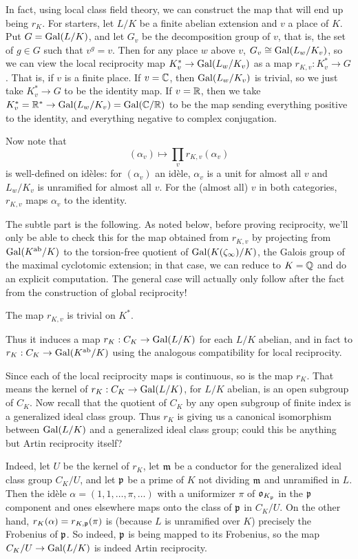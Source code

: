 In fact, using local class field theory, we can construct the map that
will end up being $r_K$. For starters, let $L/K$ be a finite abelian
extension and $v$ a place of $K$. Put $G = \operatorname{Gal}(L/K)$, and let $G_v$ be
the decomposition group of $v$, that is, the set of $g \in G$
such that $v^g = v$. Then for any place $w$ above $v$,
$G_v \cong \operatorname{Gal}(L_w/K_v)$, so we can view the local reciprocity map
$K_v^* \to \operatorname{Gal}(L_w/K_v)$ as a map $r_{K,v}: K_v^* \to G$. That is, if $v$
is a finite place. If $v = \mathbb{C}$, then $\operatorname{Gal}(L_w/K_v)$ is trivial, so
we just take $K_v^* \to G$ to be the identity map. If $v = \mathbb{R}$, then we
take $K_v^* = \mathbb{R}^* \to \operatorname{Gal}(L_w/K_v) = \operatorname{Gal}(\mathbb{C}/\mathbb{R})$ to be the map
sending everything positive to the identity, and everything negative
to complex conjugation.

Now note that
\[
(\alpha_v) \mapsto \prod_v r_{K,v}(\alpha_v) 
\]
is well-defined on id\`eles: for $(\alpha_v)$ an id\`ele, $\alpha_v$ is
a unit for almost all $v$ and $L_w/K_v$ is unramified for almost all
$v$. For the (almost all) $v$ in both categories, $r_{K,v}$ maps
$\alpha_v$ to the identity.

The subtle part is the following. As noted below, before proving reciprocity,
we'll only be able to check this for the map obtained from $r_{K,v}$ by
projecting from $\operatorname{Gal}(K^{\operatorname{ab}}/K)$ to the torsion-free quotient of $\operatorname{Gal}(K(\zeta_\infty)/K)$, the Galois
group of the maximal cyclotomic extension; in that case, we can reduce to
$K=\mathbb{Q}$ and do an explicit computation. The general case will actually only
follow after the fact from the construction of global reciprocity!
\begin{prop}
The map $r_{K,v}$ is trivial on $K^*$.    
\end{prop}
Thus it induces a map $r_K: C_K \to \operatorname{Gal}(L/K)$ for each $L/K$ abelian,
and in fact to $r_K: C_K \to \operatorname{Gal}(K^{\operatorname{ab}}/K)$ using the analogous
compatibility for local reciprocity.

Since each of the local reciprocity maps is continuous, so is the map $r_K$.
That means the kernel of $r_K: C_K \to \operatorname{Gal}(L/K)$, for $L/K$ abelian,
is an open subgroup of $C_K$. Now recall that the
quotient of $C_K$ by any open subgroup of finite index is a generalized
ideal class group. Thus $r_K$ is giving us a canonical isomorphism between
$\operatorname{Gal}(L/K)$ and a generalized ideal class group; could this be anything
but Artin reciprocity itself? 

Indeed, let $U$ be the kernel of $r_K$,  let $\mathfrak{m}$ be a conductor
for the generalized ideal class group $C_K/U$, and let $\mathfrak{p}$ be a
prime of $K$ not dividing $\mathfrak{m}$ and unramified in $L$. Then
the id\`ele $\alpha = (1,1, \dots, \pi, \dots)$ with a uniformizer $\pi$
of $\mathfrak{o}_{K_{\mathfrak{p}}}$ in the $\mathfrak{p}$ component and ones elsewhere
maps onto the class of $\mathfrak{p}$ in $C_K/U$. On the other hand,
$r_K(\alpha) = r_{K, \mathfrak{p}}(\pi)$ is (because $L$ is unramified over $K$)
precisely the Frobenius of $\mathfrak{p}$. So indeed, $\mathfrak{p}$ is being mapped
to its Frobenius, so the map $C_K/U \to \operatorname{Gal}(L/K)$ is indeed Artin reciprocity.

